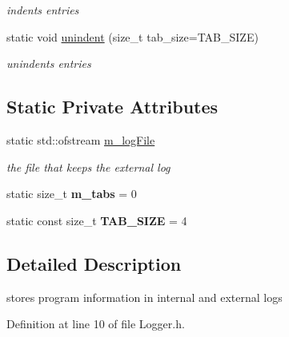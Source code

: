 \begin{DoxyCompactItemize}
\begin{DoxyCompactList}\small\item\em indents entries \end{DoxyCompactList}\item 
\mbox{\label{classnta_1_1Logger_a34abdfe89740b8e37461a610f441c8fa}} 
static void \hyperlink{classnta_1_1Logger_a34abdfe89740b8e37461a610f441c8fa}{unindent} (size\+\_\+t tab\+\_\+size=T\+A\+B\+\_\+\+S\+I\+ZE)
\begin{DoxyCompactList}\small\item\em unindents entries \end{DoxyCompactList}\end{DoxyCompactItemize}
\subsection*{Static Private Attributes}
\begin{DoxyCompactItemize}
\item 
\mbox{\label{classnta_1_1Logger_aba94cb82e0a5f5dd72719c80de5c3571}} 
static std\+::ofstream \hyperlink{classnta_1_1Logger_aba94cb82e0a5f5dd72719c80de5c3571}{m\+\_\+log\+File}
\begin{DoxyCompactList}\small\item\em the file that keeps the external log \end{DoxyCompactList}\item 
\mbox{\label{classnta_1_1Logger_a853462b3f8725ff55d36a14220335d72}} 
static size\+\_\+t {\bfseries m\+\_\+tabs} = 0
\item 
\mbox{\label{classnta_1_1Logger_a15106f36caca5fb9554163f3ae47663f}} 
static const size\+\_\+t {\bfseries T\+A\+B\+\_\+\+S\+I\+ZE} = 4
\end{DoxyCompactItemize}


\subsection{Detailed Description}
stores program information in internal and external logs 

Definition at line 10 of file Logger.\+h.



